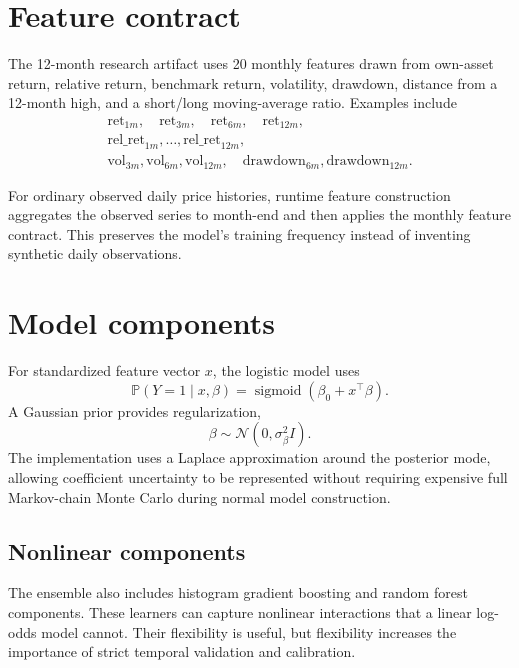 \documentclass[11pt]{article}
\newcommand{\Prb}{\mathbb{P}}
\newcommand{\sigmoid}{\operatorname{sigmoid}}
\begin{document}
\section{Feature contract}

The 12-month research artifact uses 20 monthly features drawn from own-asset return, relative return, benchmark return, volatility, drawdown, distance from a 12-month high, and a short/long moving-average ratio. Examples include
\begin{align}
\text{ret}_{1m},\quad \text{ret}_{3m},\quad \text{ret}_{6m},\quad \text{ret}_{12m},\\
\text{rel\_ret}_{1m},\ldots,\text{rel\_ret}_{12m},\\
\text{vol}_{3m},\text{vol}_{6m},\text{vol}_{12m},\quad \text{drawdown}_{6m},\text{drawdown}_{12m}.
\end{align}

For ordinary observed daily price histories, runtime feature construction aggregates the observed series to month-end and then applies the monthly feature contract. This preserves the model's training frequency instead of inventing synthetic daily observations.

\section{Model components}

For standardized feature vector $x$, the logistic model uses
\begin{equation}
\Prb(Y=1\mid x,\beta)=\sigmoid(\beta_0+x^\top\beta).
\end{equation}
A Gaussian prior provides regularization,
\begin{equation}
\beta\sim\mathcal N(0,\sigma_\beta^2 I).
\end{equation}
The implementation uses a Laplace approximation around the posterior mode, allowing coefficient uncertainty to be represented without requiring expensive full Markov-chain Monte Carlo during normal model construction.

\subsection{Nonlinear components}

The ensemble also includes histogram gradient boosting and random forest components. These learners can capture nonlinear interactions that a linear log-odds model cannot. Their flexibility is useful, but flexibility increases the importance of strict temporal validation and calibration.
\end{document}
